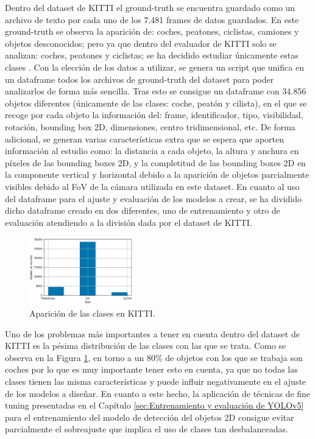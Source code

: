Dentro del dataset de KITTI el ground-truth se encuentra guardado como un archivo de texto por cada uno de los 7.481 frames de datos guardados. En este ground-truth se observa la aparición de: coches, peatones, ciclistas, camiones y objetos desconocidos; pero ya que dentro del evaluador de KITTI solo se analizan: coches, peatones y ciclistas; se ha decidido estudiar únicamente estas clases \cite{kitti_evaluator_3d}. Con la elección de los datos a utilizar, se genera un script que unifica en un dataframe todos los archivos de ground-truth del dataset para poder analizarlos de forma más sencilla. Tras esto se consigue un dataframe con 34.856 objetos diferentes (únicamente de las clases: coche, peatón y cilista), en el que se recoge por cada objeto la información del: frame, identificador, tipo, visibilidad, rotación, bounding box 2D, dimensiones, centro tridimensional, etc. De forma adicional, se generan varias características extra que se espera que aporten información al estudio como: la distancia a cada objeto, la altura y anchura en píxeles de las bounding boxes 2D, y la completitud de las bounding boxes 2D en la componente vertical y horizontal debido a la aparición de objetos parcialmente visibles debido al \ac{FoV} de la cámara utilizada en este dataset. En cuanto al uso del dataframe para el ajuste y evaluación de los modelos a crear, se ha dividido dicho dataframe creado en dos diferentes, uno de entrenamiento y otro de evaluación atendiendo a la división dada por el dataset de KITTI.

\begin{figure}[H]
    \centering
    \includegraphics[width=0.4\textwidth]{Book/figures/6_approx_distancia/classes_kitti.png}
    \caption{Aparición de las clases en KITTI.}
    \label{fig:Aparición de las clases en KITTI.}
\end{figure}

Uno de los problemas más importantes a tener en cuenta dentro del dataset de KITTI es la pésima distribución de las clases con las que se trata. Como se observa en la Figura \ref{fig:Aparición de las clases en KITTI.}, en torno a un 80\% de objetos con los que se trabaja son coches por lo que es muy importante tener esto en cuenta, ya que no todas las clases tienen las misma características y puede influir negativamente en el ajuste de los modelos a diseñar. En cuanto a este hecho, la aplicación de técnicas de fine tuning presentadas en el Capítulo \ref{sec:Entrenamiento y evaluación de YOLOv5} para el entrenamiento del modelo de detección del objetos 2D consigue evitar parcialmente el sobreajuste que implica el uso de clases tan desbalanceadas.


